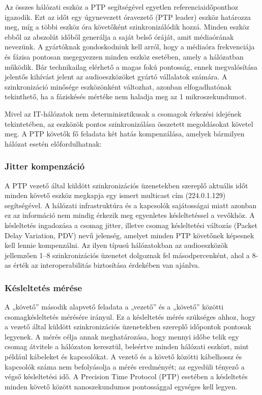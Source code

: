 Az összes hálózati eszköz a PTP segítségével egyetlen referenciaidőponthoz igazodik. Ezt az időt egy 
úgynevezett óravezető (PTP leader) eszköz határozza meg, míg a többi eszköz óra követőként szinkronizálódik hozzá. 
Minden eszköz ebből az abszolút időből generálja a saját belső óráját, amit médiaórának nevezünk. 
A gyártóknak gondoskodniuk kell arról, hogy a médiaóra frekvenciája és fázisa pontosan megegyezzen minden eszköz 
esetében, amely a hálózatban működik. Bár technikailag elérhető a magas fokú pontosság, ennek megvalósítása jelentős kihívást 
jelent az audioeszközöket gyártó vállalatok számára. 
A szinkronizáció minősége eszközönként változhat, azonban elfogadhatónak tekinthető, ha a fáziskésés mértéke nem haladja meg az 1 mikroszekundumot.

Mivel az IT-hálózatok nem determinisztikusak a csomagok érkezési idejének tekintetében, az eszközök pontos
szinkronizálása összetett megoldásokat követel meg. 
A PTP követők fő feladata két hatás kompenzálása, amelyek bármilyen hálózat esetén előfordulhatnak:
\subsubsection{Jitter kompenzáció}
A PTP vezető által küldött szinkronizációs üzenetekben szereplő aktuális időt minden követő eszköz 
megkapja egy ismert multicast cím (224.0.1.129) segítségével. A hálózati infrastruktúra és a 
kapcsolók sajátosságai miatt azonban ez az információ nem mindig érkezik meg egyenletes késleltetéssel a vevőkhöz. 
A késleltetés ingadozása a csomag jitter, illetve csomag késleltetési változás (Packet Delay Variation, PDV) 
nevű jelenség, amelyet minden PTP követőnek képesnek kell lennie kompenzálni. 
Az ilyen típusú hálózatokban az audioeszközök jellemzően 1–8 szinkronizációs üzenetet dolgoznak fel másodpercenként, 
ahol a 8-as érték az interoperabilitás biztosítása érdekében van ajánlva.








\subsubsection{Késleltetés mérése}
A „követő” második alapvető feladata a „vezető” és a „követő” közötti csomagkésleltetés mérésére irányul. 
Ez a késleltetés mérés szükséges ahhoz, hogy a vezető által küldött szinkronizációs üzenetekben szereplő időpontok pontosak legyenek. 
A mérés célja annak meghatározása, hogy mennyi időbe telik egy csomag átvitele a hálózaton keresztül, 
beleértve minden hálózati eszközt, mint például kábeleket és kapcsolókat. A vezető és a követő közötti 
kábelhossz és kapcsolók száma nem befolyásolja a mérés eredményét; az egyedüli tényező a végső késleltetési idő. 
A Precision Time Protocol (PTP) esetében a késleltetés minden követő között nanoszekundumos pontossággal egységes kell legyen.

